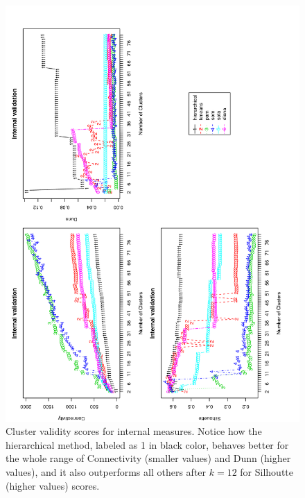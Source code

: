 \begin{figure}
 \centering
\includegraphics[angle=0, scale=0.38]{Chapter2/STval_int.png}
\caption{Cluster validity scores for internal measures. Notice how the
  hierarchical method, labeled as 1 in black color,
  behaves better for the whole range of Connectivity (smaller values)
  and Dunn (higher values),
  and it also outperforms all others after $k=12$ for Silhoutte
  (higher values) scores.}
 \label{fig:internal}
\end{figure}

